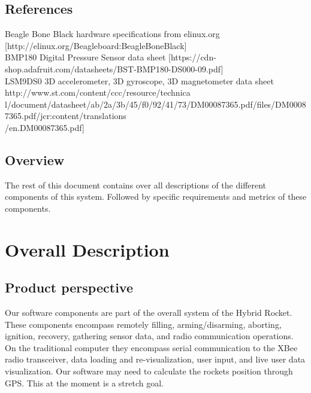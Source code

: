 \documentclass[10pt,draftclsnofoot,onecolumn,compsoc]{IEEEtran}
\begin{document}
\subsection{ References}
Beagle Bone Black hardware specifications from elinux.org [http://elinux.org/Beagleboard:BeagleBoneBlack]\\
BMP180 Digital Pressure Sensor data sheet [https://cdn-shop.adafruit.com/datasheets/BST-BMP180-DS000-09.pdf]\\
LSM9DS0 3D accelerometer, 3D gyroscope, 3D magnetometer data sheet http://www.st.com/content/ccc/resource/technica\\l/document/datasheet/ab/2a/3b/45/f0/92/41/73/DM00087365.pdf/files/DM00087365.pdf/jcr:content/translations\\/en.DM00087365.pdf]
\subsection{Overview}
The rest of this document contains over all descriptions of the different components of this system. Followed by specific requirements and metrics of these components.

\section{ Overall Description}
\subsection{ Product perspective}
Our software components are part of the overall system of the Hybrid Rocket. These components encompass remotely filling, arming/disarming, aborting, ignition, recovery, gathering sensor data, and radio communication operations.  On the traditional computer they encompass serial communication to the XBee radio transceiver, data loading and re-visualization, user input, and live user data visualization. Our software may need to calculate the rockets position through GPS. This at the moment is a stretch goal.
\end{document}
